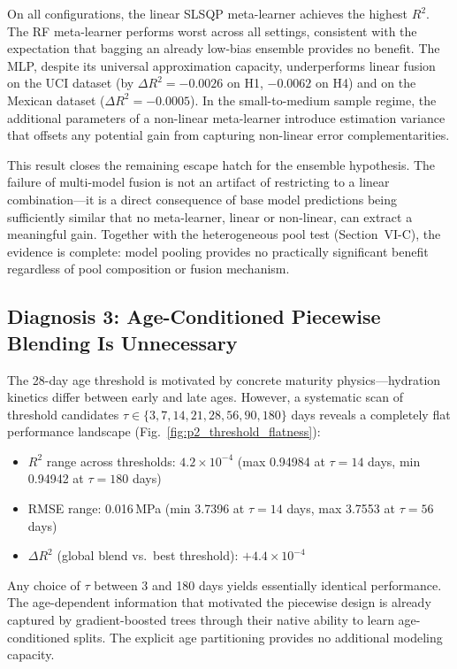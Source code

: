 \documentclass[journal]{IEEEtran}
\begin{document}
On all configurations, the linear SLSQP meta-learner achieves the highest $R^2$. The RF meta-learner performs worst across all settings, consistent with the expectation that bagging an already low-bias ensemble provides no benefit. The MLP, despite its universal approximation capacity, underperforms linear fusion on the UCI dataset (by $\Delta R^2 = -0.0026$ on H1, $-0.0062$ on H4) and on the Mexican dataset ($\Delta R^2 = -0.0005$). In the small-to-medium sample regime, the additional parameters of a non-linear meta-learner introduce estimation variance that offsets any potential gain from capturing non-linear error complementarities.

This result closes the remaining escape hatch for the ensemble hypothesis. The failure of multi-model fusion is not an artifact of restricting to a linear combination---it is a direct consequence of base model predictions being sufficiently similar that no meta-learner, linear or non-linear, can extract a meaningful gain. Together with the heterogeneous pool test (Section~VI-C), the evidence is complete: model pooling provides no practically significant benefit regardless of pool composition or fusion mechanism.

\subsection{Diagnosis 3: Age-Conditioned Piecewise Blending Is Unnecessary}

The 28-day age threshold is motivated by concrete maturity physics---hydration kinetics differ between early and late ages. However, a systematic scan of threshold candidates $\tau \in \{3, 7, 14, 21, 28, 56, 90, 180\}$ days reveals a completely flat performance landscape (Fig.~\ref{fig:p2_threshold_flatness}):

\begin{itemize}
\item $R^2$ range across thresholds: $4.2 \times 10^{-4}$ (max 0.94984 at $\tau = 14$ days, min 0.94942 at $\tau = 180$ days)
\item RMSE range: 0.016\,MPa (min 3.7396 at $\tau = 14$ days, max 3.7553 at $\tau = 56$ days)
\item $\Delta R^2$ (global blend vs.\ best threshold): $+4.4 \times 10^{-4}$
\end{itemize}

Any choice of $\tau$ between 3 and 180 days yields essentially identical performance. The age-dependent information that motivated the piecewise design is already captured by gradient-boosted trees through their native ability to learn age-conditioned splits. The explicit age partitioning provides no additional modeling capacity.
\end{document}
